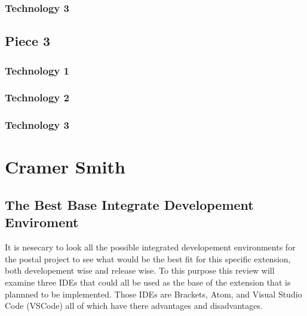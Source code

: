 \documentclass[letterpaper,10pt,titlepage,draftclsnofoot,onecolumn,onesided] {IEEEtran}
\begin{document}
\subsubsection{Technology 3}

\subsection{Piece 3}
\subsubsection{Technology 1}
\subsubsection{Technology 2}
\subsubsection{Technology 3}


\section{Cramer Smith}
%
\subsection{The Best Base Integrate Developement Enviroment} 
It is nesecary to look all the possible integrated developement environments for the postal project to see what would be the best fit for this specific extension, both developement wise and release wise.
To this purpose this review will examine three IDEs that could all be used as the base of the extension that is plannned to be implemented.
Those IDEs are Brackets, Atom, and Visual Studio Code (VSCode) all of which have there advantages and disadvantages.
\end{document}

